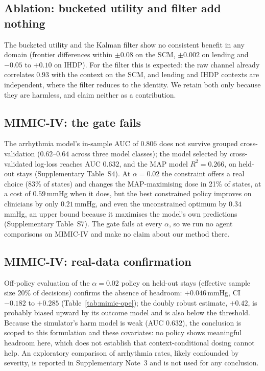 \documentclass[10pt,a4paper]{article}
\begin{document}
\subsection*{Ablation: bucketed utility and filter add nothing}
The bucketed utility and the Kalman filter show no consistent benefit in any domain (frontier differences within $\pm0.08$ on the SCM, $\pm0.002$ on lending and $-0.05$ to $+0.10$ on IHDP). For the filter this is expected: the raw channel already correlates $0.93$ with the context on the SCM, and lending and IHDP contexts are independent, where the filter reduces to the identity. We retain both only because they are harmless, and claim neither as a contribution.

\subsection*{MIMIC-IV: the gate fails}
The arrhythmia model's in-sample AUC of $0.806$ does not survive grouped cross-validation
($0.62$--$0.64$ across three model classes); the model selected by cross-validated log-loss reaches AUC
$0.632$, and the MAP model $R^2=0.266$, on held-out stays (Supplementary Table~S4). At $\alpha=0.02$
the constraint offers a real choice (83\% of states) and changes the MAP-maximising dose in 21\% of
states, at a cost of $0.59$\,mmHg when it does, but the best constrained policy improves on clinicians
by only $0.21$\,mmHg, and even the unconstrained optimum by $0.34$\,mmHg, an upper bound because it
maximises the model's own predictions (Supplementary Table~S7). The gate fails at every $\alpha$,
so we run no agent comparisons on MIMIC-IV and make no claim about our method there.



\subsection*{MIMIC-IV: real-data confirmation}
Off-policy evaluation of the $\alpha=0.02$ policy on held-out stays (effective sample size 20\% of
decisions) confirms the absence of headroom: $+0.046$\,mmHg, CI $-0.182$ to $+0.285$
(Table~\ref{tab:mimic-ope}); the doubly robust estimate, $+0.42$, is probably biased upward by its
outcome model and is also below the threshold. Because the simulator's harm model is weak (AUC $0.632$), the conclusion is scoped to this formulation and these covariates: no policy shows meaningful headroom here, which does not establish that context-conditional dosing cannot help. An exploratory comparison of arrhythmia rates, likely confounded by severity, is reported in Supplementary Note~3 and is not used for any conclusion.
\end{document}
